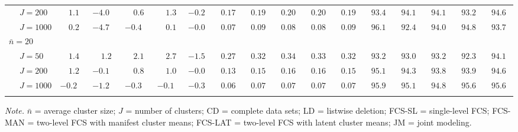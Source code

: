 \begin{sidewaystable}
\begin{threeparttable}
\begin{tabular}{llccccccccccccccc}
 & \nopagebreak $\;J=200$  & $\phantom{-}1.1\phantom{0}$ & ${-}4.0\phantom{0}$ & $\phantom{-}0.6\phantom{0}$ & $\phantom{-}1.3\phantom{0}$ & ${-}0.2\phantom{0}$ & $\phantom{0}0.17\phantom{0}$ & $\phantom{0}0.19\phantom{0}$ & $\phantom{0}0.20\phantom{0}$ & $\phantom{0}0.20\phantom{0}$ & $\phantom{0}0.19\phantom{0}$ & $\phantom{0}93.4\phantom{0}$ & $\phantom{0}94.1\phantom{0}$ & $\phantom{0}94.1\phantom{0}$ & $\phantom{0}93.2\phantom{0}$ & $\phantom{0}94.6\phantom{0}$ \\
 & \nopagebreak $\;J=1000$  & $\phantom{-}0.2\phantom{0}$ & ${-}4.7\phantom{0}$ & ${-}0.4\phantom{0}$ & $\phantom{-}0.1\phantom{0}$ & ${-}0.0\phantom{0}$ & $\phantom{0}0.07\phantom{0}$ & $\phantom{0}0.09\phantom{0}$ & $\phantom{0}0.08\phantom{0}$ & $\phantom{0}0.08\phantom{0}$ & $\phantom{0}0.09\phantom{0}$ & $\phantom{0}96.1\phantom{0}$ & $\phantom{0}92.4\phantom{0}$ & $\phantom{0}94.0\phantom{0}$ & $\phantom{0}94.8\phantom{0}$ & $\phantom{0}93.7\phantom{0}$ \\
\multicolumn{4}{l}{$\bar{n}=20$} \\  & \nopagebreak $\;J=50$  & $\phantom{-}1.4\phantom{0}$ & $\phantom{-}1.2\phantom{0}$ & $\phantom{-}2.1\phantom{0}$ & $\phantom{-}2.7\phantom{0}$ & ${-}1.5\phantom{0}$ & $\phantom{0}0.27\phantom{0}$ & $\phantom{0}0.32\phantom{0}$ & $\phantom{0}0.34\phantom{0}$ & $\phantom{0}0.33\phantom{0}$ & $\phantom{0}0.32\phantom{0}$ & $\phantom{0}93.2\phantom{0}$ & $\phantom{0}93.0\phantom{0}$ & $\phantom{0}93.2\phantom{0}$ & $\phantom{0}92.3\phantom{0}$ & $\phantom{0}94.1\phantom{0}$ \\
 & \nopagebreak $\;J=200$  & $\phantom{-}1.2\phantom{0}$ & ${-}0.1\phantom{0}$ & $\phantom{-}0.8\phantom{0}$ & $\phantom{-}1.0\phantom{0}$ & ${-}0.0\phantom{0}$ & $\phantom{0}0.13\phantom{0}$ & $\phantom{0}0.15\phantom{0}$ & $\phantom{0}0.16\phantom{0}$ & $\phantom{0}0.16\phantom{0}$ & $\phantom{0}0.15\phantom{0}$ & $\phantom{0}95.1\phantom{0}$ & $\phantom{0}94.3\phantom{0}$ & $\phantom{0}93.8\phantom{0}$ & $\phantom{0}93.9\phantom{0}$ & $\phantom{0}94.6\phantom{0}$ \\
 & \nopagebreak $\;J=1000$  & ${-}0.2\phantom{0}$ & ${-}1.2\phantom{0}$ & ${-}0.3\phantom{0}$ & ${-}0.1\phantom{0}$ & ${-}0.3\phantom{0}$ & $\phantom{0}0.06\phantom{0}$ & $\phantom{0}0.07\phantom{0}$ & $\phantom{0}0.07\phantom{0}$ & $\phantom{0}0.07\phantom{0}$ & $\phantom{0}0.07\phantom{0}$ & $\phantom{0}95.9\phantom{0}$ & $\phantom{0}95.1\phantom{0}$ & $\phantom{0}94.8\phantom{0}$ & $\phantom{0}95.6\phantom{0}$ & $\phantom{0}95.6\phantom{0}$ \\
[0.5ex]\hline\\[-1.6ex] 
\end{tabular}
\begin{tablenotes}{\footnotesize \textit{Note.} $\bar{n}$ = average cluster size; $J$ = number of clusters; CD = complete data sets; LD = listwise deletion; FCS-SL = single-level FCS; FCS-MAN = two-level FCS with manifest cluster means; FCS-LAT = two-level FCS with latent cluster means; JM = joint modeling.}\end{tablenotes}
\end{threeparttable}
\end{sidewaystable}
